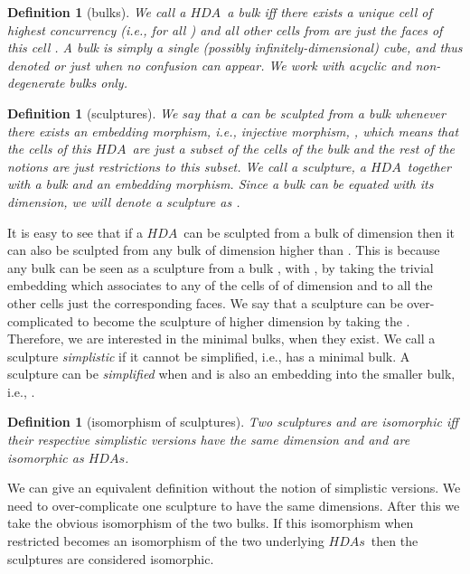 \documentclass[submission,copyright,creativecommons]{eptcs}
\newtheorem{definition}[theorem]{Definition}
\newcommand\HDA{\ensuremath{\mathit{HDA}}}
\newcommand\HDAs{\ensuremath{\mathit{HDAs}}}
\begin{document}
\begin{definition}[bulks]\label{def_bulks}
We call a \HDA\ \emph{a bulk} iff there exists a unique cell of highest concurrency (i.e.,  for all ) and all other cells from  are just the faces of this cell . A bulk is simply a single (possibly infinitely-dimensional) cube, and thus denoted  or just  when no confusion can appear.
We work with acyclic and non-degenerate bulks only.
\end{definition}

\begin{definition}[sculptures]\label{def_sculptures}
We say that a  can be \emph{sculpted} from a bulk  whenever there exists an embedding morphism, i.e., injective morphism, , which means that the cells of this \HDA\ are just a subset of the cells of the bulk and the rest of the notions are just restrictions to this subset. 
We call a \emph{sculpture}, a \HDA\ together with a bulk and an embedding morphism. Since a bulk can be equated with its dimension, we will denote a sculpture as .
\end{definition}

It is easy to see that if a \HDA\ can be sculpted from a bulk  of dimension  then it can also be sculpted from any bulk of dimension higher than . This is because any bulk  can be seen as a sculpture from a bulk , with , by taking the trivial embedding  which associates to  any of the cells of  of dimension  and to all the other cells just the corresponding faces. We say that a sculpture  can be over-complicated to become the sculpture  of higher dimension by taking the .
Therefore, we are interested in the minimal bulks, when they exist. We call a sculpture \emph{simplistic} if it cannot be simplified, i.e., has a minimal bulk. A sculpture  can be \emph{simplified} when  and  is also an embedding into the smaller bulk, i.e., .


\begin{definition}[isomorphism of sculptures]\label{def_iso_sculptures}
Two sculptures  and  are isomorphic iff their respective simplistic versions have the same dimension and  and  are isomorphic as \HDAs.
\end{definition}

We can give an equivalent definition without the notion of simplistic versions. We need to over-complicate one sculpture to have the same dimensions. After this we take the obvious isomorphism of the two bulks. If this isomorphism when restricted becomes an isomorphism of the two underlying \HDAs\ then the sculptures are considered isomorphic. 
\end{document}

